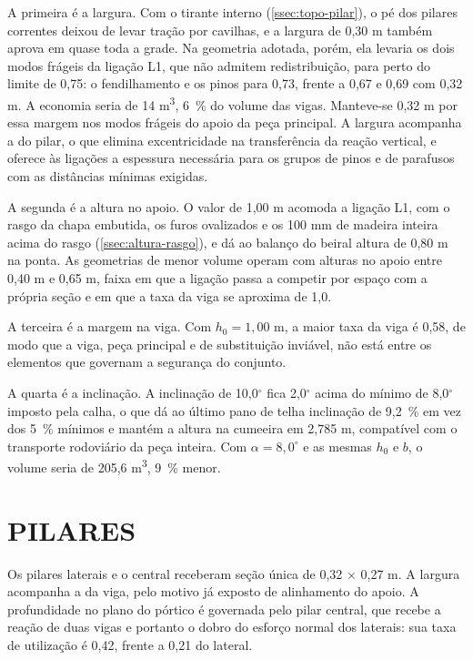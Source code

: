 A primeira é a largura. Com o tirante interno (\autoref{ssec:topo-pilar}), o pé
dos pilares correntes deixou de levar tração por cavilhas, e a largura de 0,30 m
também aprova em quase toda a grade. Na geometria adotada, porém, ela levaria os
dois modos frágeis da ligação L1, que não admitem redistribuição, para perto do
limite de 0,75: o fendilhamento e os pinos para 0,73, frente a 0,67 e 0,69
com 0,32 m. A economia seria de 14 m\textsuperscript{3}, 6~\% do volume das
vigas. Manteve-se 0,32 m por essa margem nos modos frágeis do apoio da peça
principal. A largura
acompanha a do pilar, o que elimina excentricidade na transferência da reação
vertical, e oferece às ligações a espessura necessária para os grupos de pinos e
de parafusos com as distâncias mínimas exigidas.

A segunda é a altura no apoio. O valor de 1,00 m acomoda a ligação L1, com o rasgo
da chapa embutida, os furos ovalizados e os 100 mm de madeira inteira acima do
rasgo (\autoref{ssec:altura-rasgo}), e dá ao balanço do beiral altura de 0,80 m na
ponta. As geometrias de menor volume operam com alturas no apoio entre 0,40 m e
0,65 m, faixa em que a ligação passa a competir por espaço com a própria seção e
em que a taxa da viga se aproxima de 1,0.

A terceira é a margem na viga. Com $h_0 = 1{,}00$ m, a maior taxa da viga é 0,58,
de modo que a viga, peça principal e de substituição inviável, não está entre os
elementos que governam a segurança do conjunto.

A quarta é a inclinação. A inclinação de 10,0$^{\circ}$ fica 2,0$^{\circ}$ acima do
mínimo de 8,0$^{\circ}$ imposto pela calha, o que dá ao último pano de telha
inclinação de 9,2~\% em vez dos 5~\% mínimos e mantém a altura na cumeeira em
2,785 m, compatível com o transporte rodoviário da peça inteira. Com
$\alpha = 8{,}0^{\circ}$ e as mesmas $h_0$ e $b$, o volume seria de 205,6
m\textsuperscript{3}, 9~\% menor.

\section{PILARES}\label{sec:predim-pilares}

Os pilares laterais e o central receberam seção única de
0,32 $\times$ 0,27 m. A largura acompanha a da viga, pelo motivo já exposto de
alinhamento do apoio. A profundidade no plano do pórtico é governada pelo pilar
central, que recebe a reação de duas vigas e portanto o dobro do esforço normal
dos laterais: sua taxa de utilização é 0,42, frente a 0,21 do lateral.

